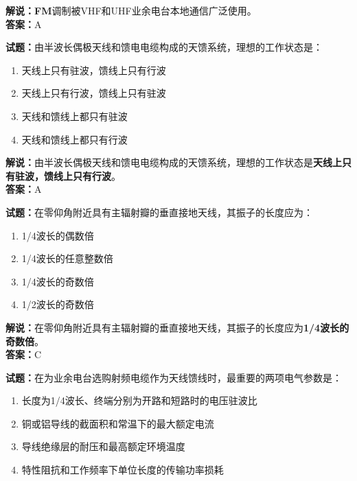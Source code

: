 \documentclass{ctexbook}
\begin{document}
\noindent\textbf{解说：}\textbf{FM}调制被VHF和UHF业余电台本地通信广泛使用。\\\noindent\textbf{答案：}A

\bigskip

\noindent\textbf{试题：}由半波长偶极天线和馈电电缆构成的天馈系统，理想的工作状态是：

\begin{enumerate}[leftmargin=3em]
  \item 天线上只有驻波，馈线上只有行波
  \item 天线上只有行波，馈线上只有驻波
  \item 天线和馈线上都只有驻波
  \item 天线和馈线上都只有行波
\end{enumerate}

\noindent\textbf{解说：}由半波长偶极天线和馈电电缆构成的天馈系统，理想的工作状态是\textbf{天线上只有驻波，馈线上只有行波}。\\\noindent\textbf{答案：}A%

\bigskip

\noindent\textbf{试题：}在零仰角附近具有主辐射瓣的垂直接地天线，其振子的长度应为：

\begin{enumerate}[leftmargin=3em]
  \item 1/4波长的偶数倍
  \item 1/4波长的任意整数倍
  \item 1/4波长的奇数倍
  \item 1/2波长的奇数倍
\end{enumerate}

\noindent\textbf{解说：}在零仰角附近具有主辐射瓣的垂直接地天线，其振子的长度应为\textbf{1/4波长的奇数倍}。\\\noindent\textbf{答案：}C%

\bigskip

\noindent\textbf{试题：}在为业余电台选购射频电缆作为天线馈线时，最重要的两项电气参数是：

\begin{enumerate}[leftmargin=3em]
  \item 长度为1/4波长、终端分别为开路和短路时的电压驻波比
  \item 铜或铝导线的截面积和常温下的最大额定电流
  \item 导线绝缘层的耐压和最高额定环境温度
  \item 特性阻抗和工作频率下单位长度的传输功率损耗
\end{enumerate}
\end{document}
